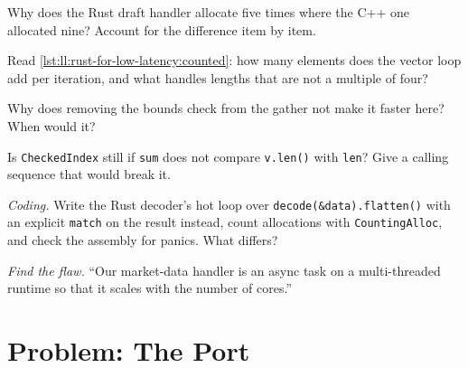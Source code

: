 \begin{exercise}[$\star$]\label{exo:ll:rust-for-low-latency:3}
Why does the Rust draft handler allocate five times where the C++ one allocated nine? Account for the difference item by
item.
\end{exercise}

\begin{exercise}[$\star\star$]\label{exo:ll:rust-for-low-latency:4}
Read \cref{lst:ll:rust-for-low-latency:counted}: how many elements does the vector loop add per iteration, and what handles
lengths that are not a multiple of four?
\end{exercise}

\begin{exercise}[$\star\star$]\label{exo:ll:rust-for-low-latency:5}
Why does removing the bounds check from the gather not make it faster here? When would it?
\end{exercise}

\begin{exercise}[$\star\star$]\label{exo:ll:rust-for-low-latency:6}
Is \texttt{CheckedIndex} still  if \texttt{sum} does not compare \texttt{v.len()} with \texttt{len}? Give a calling
sequence that would break it.
\end{exercise}

\begin{exercise}[$\star\star\star$]\label{exo:ll:rust-for-low-latency:7}
\emph{Coding.} Write the Rust decoder's hot loop over \texttt{decode(\&data).flatten()} with an explicit \texttt{match} on
the result instead, count allocations with \texttt{CountingAlloc}, and check the assembly for panics. What differs?
\end{exercise}

\begin{exercise}[$\star\star\star$]\label{exo:ll:rust-for-low-latency:8}
\emph{Find the flaw.} ``Our market-data handler is an async task on a multi-threaded runtime so that it scales with the
number of cores.''
\end{exercise}

\section{Problem: The Port}

